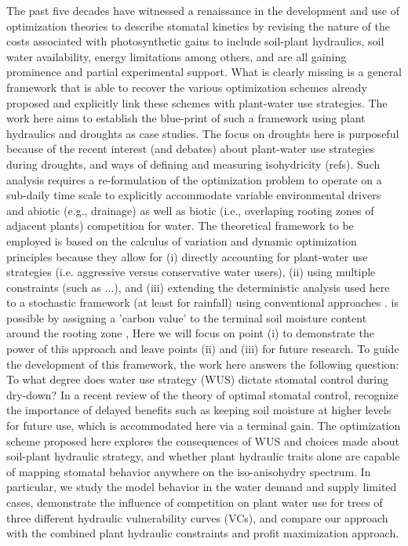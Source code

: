 \documentclass[utf8]{frontiersSCNS} %
\begin{document}
The past five decades have witnessed a renaissance in the development and use of optimization theories to describe stomatal kinetics by revising the nature of the costs associated with photosynthetic gains to include soil-plant hydraulics, soil water availability, energy limitations \citep{roth2018fossil} among others, and are all gaining prominence and partial experimental support.  What is clearly missing is a general framework that is able to recover the various optimization schemes already proposed and explicitly link these schemes with plant-water use strategies.  The work here aims to establish the blue-print of such a framework using plant hydraulics and droughts as case studies.  The focus on droughts here is purposeful because of the recent interest (and debates) about plant-water use strategies during droughts, and ways of defining and measuring isohydricity (refs).  Such analysis requires a re-formulation of the optimization problem to operate on a sub-daily time scale to explicitly accommodate variable environmental drivers and abiotic (e.g., drainage) as well as biotic (i.e., overlaping rooting zones of adjacent plants) competition for water. The theoretical framework to be employed is based on the calculus of variation and dynamic optimization principles because they allow for (i) directly accounting for plant-water use strategies (i.e. aggressive versus conservative water users), (ii) using multiple constraints (such as ...), and  (iii) extending the deterministic analysis used here to a stochastic framework (at least for rainfall) using conventional approaches  \citep{cowan1986economics,makela1996optimal,manzoni_optimization_2013,lu2016optim}.  is possible by assigning a 'carbon value' to the terminal soil moisture content around the rooting zone \citep{manzoni_optimization_2013},   Here we will focus on point (i) to demonstrate the power of this approach and leave points (ii) and (iii)  for future research.   
To guide the development of this framework, the work here answers the following question: To what degree does water use strategy (WUS) dictate stomatal control during dry-down? In a recent review of the theory of optimal stomatal control, \citet{buckley_optimal_2017} recognize the importance of delayed benefits such as keeping soil moisture at higher levels for future use, which is accommodated here via a terminal gain. The optimization scheme proposed here explores the consequences of WUS and choices made about soil-plant hydraulic strategy, and whether plant hydraulic traits alone are capable of mapping stomatal behavior anywhere on the iso-anisohydry spectrum. In particular, we study the model behavior in the water demand and supply limited cases, demonstrate the influence of competition on plant water use for trees of three different hydraulic vulnerability curves (VCs), and compare our approach with the combined plant hydraulic constraints and profit maximization approach.
\end{document}
